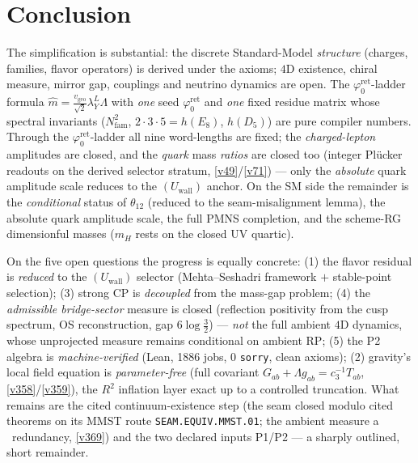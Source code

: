 \documentclass[11pt,a4paper]{article}
\newcommand{\Nfam}{N_{\mathrm{fam}}}
\newcommand{\cthree}{c_3}
\newcommand{\phiz}{\varphi_0^{\mathrm{ret}}}
\newcommand{\lamY}{\lambda_Y}
\newcommand{\vgeo}{v_{\mathrm{geo}}}
\theoremstyle{definition}
\begin{document}
\section*{Conclusion}
The simplification is substantial: the discrete Standard-Model \emph{structure} (charges, families, flavor operators) is derived under the axioms; $4$D existence, chiral measure, mirror gap, couplings and neutrino dynamics are open.  The $\phiz$-ladder formula $\hat m=\tfrac{\vgeo}{\sqrt2}\lamY^{L}\Lambda$ with
\emph{one} seed $\phiz$ and \emph{one} fixed residue matrix whose spectral invariants
($\Nfam^2$, $2{\cdot}3{\cdot}5{=}h(E_8)$, $h(D_5)$) are pure compiler numbers. Through the $\phiz$-ladder all
nine word-lengths are fixed; the \emph{charged-lepton} amplitudes are closed, and the \emph{quark} mass
\emph{ratios} are closed too (integer Plücker readouts on the derived selector stratum, \vref{v49}/\vref{v71}) --- only the
\emph{absolute} quark amplitude scale reduces to the $(U_{\mathrm{wall}})$ anchor. On
the SM side the remainder is the \emph{conditional} status of $\theta_{12}$ (reduced to the
seam-misalignment lemma), the absolute quark amplitude scale, the full PMNS completion, and the scheme-RG
dimensionful masses ($m_H$ rests on the closed UV quartic).

On the five open questions the progress is equally concrete: (1) the flavor residual is \emph{reduced} to
the $(U_{\mathrm{wall}})$ selector (Mehta--Seshadri framework $+$ stable-point selection); (3) strong CP is
\emph{decoupled} from the mass-gap problem; (4) the \emph{admissible
bridge-sector} measure is closed (reflection positivity from the cusp spectrum, OS reconstruction, gap
$6\log\tfrac32$) --- \emph{not} the full ambient $4$D dynamics, whose unprojected measure remains
conditional on ambient RP; (5) the P2 algebra is \emph{machine-verified} (Lean, 1886 jobs, 0
\texttt{sorry}, clean axioms); (2) gravity's local field equation is \emph{parameter-free} (full covariant
$G_{ab}{+}\Lambda g_{ab}{=}\cthree^{-1}T_{ab}$, \vref{v358}/\vref{v359}), the $R^2$ inflation layer exact up to
a controlled truncation. What remains are the cited continuum-existence step (the seam closed modulo cited
theorems on its MMST route \texttt{SEAM.EQUIV.MMST.01}; the ambient measure a \mC\ redundancy, \vref{v369}) and the two declared inputs P1/P2 --- a
sharply outlined, short remainder.
\end{document}
